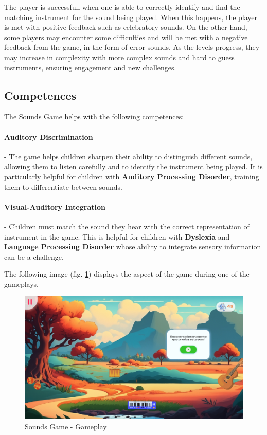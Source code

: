 The player is successfull when one is able to correctly identify and find the matching instrument for the sound being played. When this happens, the player is met with positive feedback such as celebratory sounds. On the other hand, some players may encounter some difficulties and will be met with a negative feedback from the game, in the form of error sounds.
As the levels progress, they may increase in complexity with more complex sounds and hard to guess instruments, ensuring engagement and new challenges.

\subsection*{Competences}
The Sounds Game helps with the following competences:

\paragraph{Auditory Discrimination}- The game helps children sharpen their ability to distinguish different sounds, allowing them to listen carefully and to identify the instrument being played. It is particularly helpful for children with \textbf{Auditory Processing Disorder}, training them to differentiate between sounds.

\paragraph{Visual-Auditory Integration}- Children must match the sound they hear with the correct representation of instrument in the game. This is helpful for children with \textbf{Dyslexia} and \textbf{Language Processing Disorder} whose ability to integrate sensory information can be a challenge.

The following image (fig. \ref{fig:soundsGameplay}) displays the aspect of the game during one of the gameplays.
\begin{figure}[H]
    \centering
    \includegraphics[scale=0.45]{Chapters/gameplay/SoundsGame.jpg}
    \caption{Sounds Game - Gameplay}
    \label{fig:soundsGameplay}    
\end{figure}

